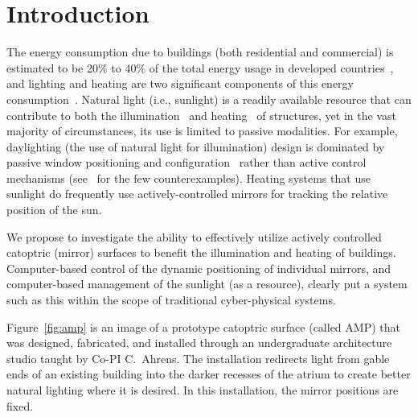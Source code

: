 \section{Introduction}
\label{sec:intro}

The energy consumption due to buildings (both residential and commercial)
is estimated to be 20\% to 40\% of the total energy usage in
developed countries~\cite{pop08}, and
lighting and heating are two significant components of this energy
consumption~\cite{keh05}.
Natural light (i.e., sunlight) is a readily available resource that
can contribute to both the illumination~\cite{Leslie03}
and heating~\cite{Lunde80} of structures,
yet in the vast majority of circumstances, its use is limited to
passive modalities.  For example, daylighting (the use of natural
light for illumination) design is dominated by passive window positioning
and configuration~\cite{vgf+13} rather than active control mechanisms
(see~\cite{kt16} for the few counterexamples).
Heating systems that use sunlight do frequently use actively-controlled mirrors
for tracking the relative position of the sun.

We propose to investigate the ability to effectively utilize actively
controlled catoptric (mirror) surfaces to benefit the illumination and
heating of buildings.  Computer-based control of the dynamic positioning of
individual mirrors, and computer-based management of the sunlight
(as a resource), clearly put a system such as this within the scope
of traditional cyber-physical systems.

Figure~\ref{fig:amp} is an image of a prototype catoptric surface
(called AMP) that was designed, fabricated, and installed through an
undergraduate architecture studio taught by Co-PI C.~Ahrens. The installation
redirects light from gable ends of an existing building into the darker
recesses of the atrium to create better natural lighting where it is desired.
In this installation, the mirror positions are fixed.

